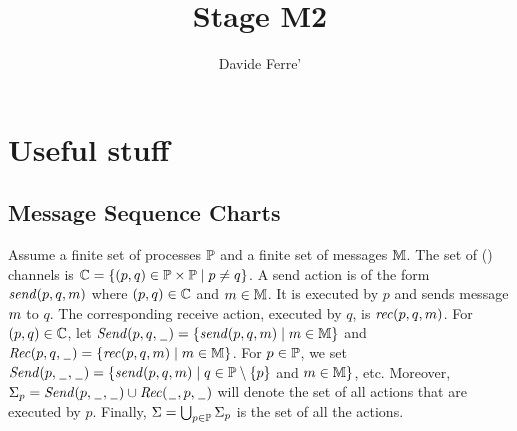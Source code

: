 \documentclass{article}
\title{Stage M2}
\author{Davide Ferre'}
\begin{document}
\maketitle

\section{Useful stuff}
\subsection{Message Sequence Charts}

Assume a finite set of processes $\Procs$ and a finite set of messages $\Msg$.
The set of (\pp) channels is $\Ch = \{(p,q) \in \Procs \times \Procs \mid p \neq q\}$.
%
A send action is of the form $\sact{p}{q}{\msg}$
where $(p,q) \in \Ch$ and $\msg \in \Msg$.
It is executed by $p$ and sends message $\msg$ to $q$.
The corresponding receive action, executed by $q$, is
$\ract{p}{q}{\msg}$.
%
For $(p,q) \in \Ch$, let
$\pqsAct{p}{q} = \{\sact{p}{q}{\msg} \mid \msg \in \Msg\}$ and
$\pqrAct{p}{q} = \{\ract{p}{q}{\msg} \mid \msg \in \Msg\}$.
For $p \in \Procs$, we set
$\psAct{p} = \{\sact{p}{q}{\msg} \mid q \in \Procs \setminus \{p\}$ and $\msg \in \Msg\}$, etc.
Moreover, $\pAct{p} = \psAct{p} \cup \qrAct{p}$ will denote the set of all actions that are
executed by $p$.
Finally, $\Act = \bigcup_{p \in \Procs} \pAct{p}$
is the set of all the actions.
\end{document}
